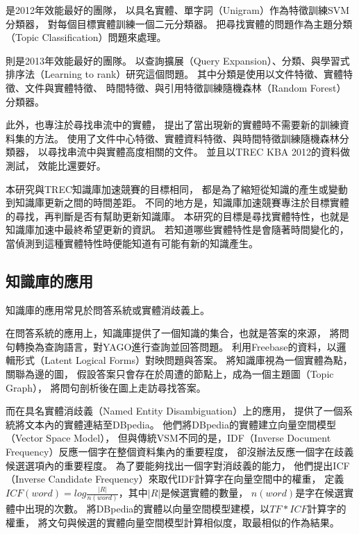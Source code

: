 

\cite{kba-hltoce}是2012年效能最好的團隊，
以具名實體、單字詞（Unigram）作為特徵訓練SVM分類器，
對每個目標實體訓練一個二元分類器。
把尋找實體的問題作為主題分類（Topic Classification）問題來處理。

\cite{kba-msra}則是2013年效能最好的團隊。
以查詢擴展（Query Expansion）、分類、與學習式排序法（Learning to rank）研究這個問題。
其中分類是使用以文件特徵、實體特徵、文件與實體特徵、
時間特徵、與引用特徵訓練隨機森林（Random Forest）分類器。

此外，\cite{kba-entity-detection}也專注於尋找串流中的實體，
提出了當出現新的實體時不需要新的訓練資料集的方法。
使用了文件中心特徵、實體資料特徵、與時間特徵訓練隨機森林分類器，
以尋找串流中與實體高度相關的文件。
並且以TREC KBA 2012的資料做測試，
效能比\cite{kba-hltoce}還要好。

本研究與TREC知識庫加速競賽的目標相同，
都是為了縮短從知識的產生或變動到知識庫更新之間的時間差距。
不同的地方是，知識庫加速競賽專注於目標實體的尋找，再判斷是否有幫助更新知識庫。
本研究的目標是尋找實體特性，也就是知識庫加速中最終希望更新的資訊。
若知道哪些實體特性是會隨著時間變化的，
當偵測到這種實體特性時便能知道有可能有新的知識產生。

\subsection{知識庫的應用}

知識庫的應用常見於問答系統或實體消歧義上。

在問答系統的應用上，知識庫提供了一個知識的集合，也就是答案的來源，
\cite{yago-qa}將問句轉換為查詢語言，對YAGO進行查詢並回答問題。
\cite{freebase-qa-extract}利用Freebase的資料，以邏輯形式（Latent Logical Forms）對映問題與答案。
\cite{freebase-qa-parse}將知識庫視為一個實體為點，關聯為邊的圖，
假設答案只會存在於周遭的節點上，成為一個主題圖（Topic Graph），
將問句剖析後在圖上走訪尋找答案。

而在具名實體消歧義（Named Entity Disambiguation）上的應用，
\cite{dbpedia-spotlight} 提供了一個系統將文本內的實體連結至DBpedia。
他們將DBpedia的實體建立向量空間模型（Vector Space Model），
但與傳統VSM不同的是，IDF（Inverse Document Frequency）反應一個字在整個資料集內的重要程度，
卻沒辦法反應一個字在歧義候選選項內的重要程度。
為了要能夠找出一個字對消歧義的能力，
他們提出ICF（Inverse Candidate Frequency）來取代IDF計算字在向量空間中的權重，
定義$ICF(word) = log \frac{|R|}{n(word)}$，其中$|R|$是候選實體的數量，
$n(word)$是字在候選實體中出現的次數。
將DBpedia的實體以向量空間模型建模，以$TF*ICF$計算字的權重，
將文句與候選的實體向量空間模型計算相似度，取最相似的作為結果。

